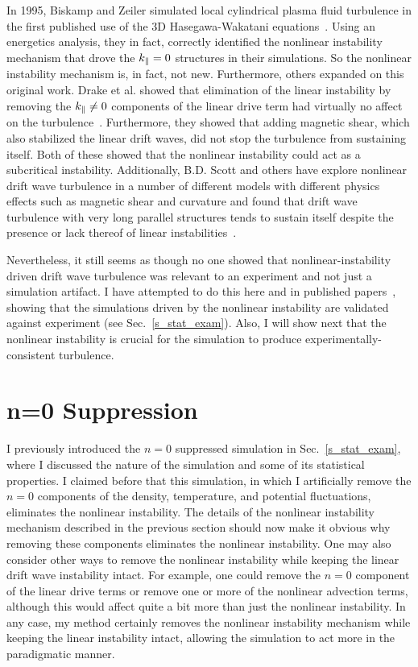 In 1995, Biskamp and Zeiler simulated local cylindrical plasma fluid turbulence in the first published use of the 3D Hasegawa-Wakatani equations~\cite{biskamp1995}. 
Using an energetics analysis, they in fact, correctly identified the nonlinear instability mechanism that drove the $k_\parallel=0$ structures in their simulations. So the nonlinear instability
mechanism is, in fact, not new. Furthermore, others expanded on this original work. 
Drake et al. showed that elimination of the linear instability by removing the $k_\parallel \ne 0$ components of the linear drive term
had virtually no affect on the turbulence~\cite{drake1995}. Furthermore, they showed that adding magnetic shear, which also stabilized the linear drift waves, did not stop the turbulence
from sustaining itself. Both of these showed that the nonlinear instability could act as a subcritical instability.
Additionally, B.D. Scott and others have explore nonlinear drift wave turbulence in a number of different models with different physics effects such as magnetic shear and curvature
and found that drift wave turbulence with very long parallel structures tends to sustain itself despite the presence or lack thereof of linear 
instabilities~\cite{scott1990,scott1992,zeiler1996,zeiler1997,korsholm1999,scott2002,scott2003,scott2005}.

Nevertheless, it still seems as though no one showed that nonlinear-instability driven drift wave turbulence was relevant to an experiment and not just a simulation artifact. I have attempted
to do this here and in published papers~\cite{friedman2012b,friedman2013},
showing that the simulations driven by the nonlinear instability are validated against experiment (see Sec.~\ref{s_stat_exam}). Also, I will show next that the nonlinear instability
is crucial for the simulation to produce experimentally-consistent turbulence.


\section{n=0 Suppression}
\label{s_n0_supp}

I previously introduced the $n=0$ suppressed simulation in Sec.~\ref{s_stat_exam}, where I discussed the nature of the simulation and some of its statistical properties. I claimed before that
this simulation, in which I artificially remove the $n=0$ components of the density, temperature, and potential fluctuations, eliminates the nonlinear instability.
The details of the nonlinear instability mechanism described in the previous section should now make it obvious why removing these components eliminates the nonlinear instability.
One may also consider other ways to remove the nonlinear instability while keeping the linear drift wave instability intact. For example, one could remove the $n=0$ component of the linear
drive terms or remove one or more of the nonlinear advection terms, although this would affect quite a bit more than just the nonlinear instability. In any case, my method
certainly removes the nonlinear instability mechanism while keeping the linear instability intact, allowing the simulation to act more in the paradigmatic manner.

